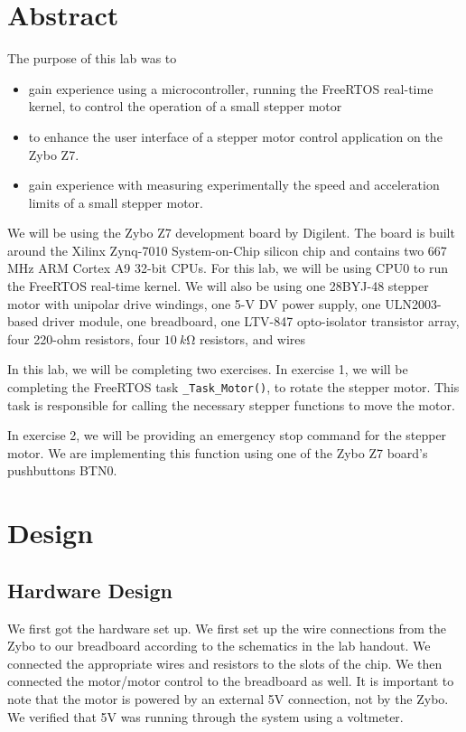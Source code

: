 \documentclass[11pt, letterpaper, titlepage]{article}
\title{\textbf{\Huge{ 
\begin{center}
ECE 315 Lab 4 🧀
\end{center} 
}}}
\author{For Ahmed and Shyama 🎁💯🙏 \\ \\ 🚙 Lora Ma \\ 🌎 Benjamin Kong \\ \\ECE 315 Lab Section H41}
\begin{document}
\maketitle
\thispagestyle{empty}
\tableofcontents 
\newpage
{}

\section{Abstract}
The purpose of this lab was to 
\begin{itemize}
  \item gain experience using a microcontroller, running the FreeRTOS real-time kernel, to control the operation of a small stepper motor
  \item to enhance the user interface of a stepper motor control application on the Zybo Z7.
  \item gain experience with measuring experimentally the speed and acceleration limits of a small stepper motor.
\end{itemize}
We will be using the Zybo Z7 development board by Digilent. The board is built around the Xilinx Zynq-7010 System-on-Chip silicon chip and contains two 667 MHz ARM Cortex A9 32-bit CPUs. For this lab, we will be using CPU0 to run the FreeRTOS real-time kernel. We will also be using one 28BYJ-48 stepper motor with unipolar drive windings, one 5-V DV power supply, one ULN2003-based driver module, one breadboard, one LTV-847 opto-isolator transistor array, four 220-ohm resistors, four $\SI{10}{k\ohm}$ resistors, and wires

In this lab, we will be completing two exercises. In exercise 1, we will be completing the FreeRTOS task \texttt{_Task_Motor()}, to rotate the stepper motor. This task is responsible for calling the necessary stepper functions to move the motor.

In exercise 2, we will be providing an emergency stop command for the stepper motor. We are implementing this function using one of the Zybo Z7 board's pushbuttons BTN0.

\section{Design}

\subsection{Hardware Design}
We first got the hardware set up. We first set up the wire connections from the Zybo to our breadboard according to the schematics in the lab handout. We connected the appropriate wires and resistors to the slots of the chip. We then connected the motor/motor control to the breadboard as well. It is important to note that the motor is powered by an external 5V connection, not by the Zybo. We verified that 5V was running through the system using a voltmeter.
\end{document}
